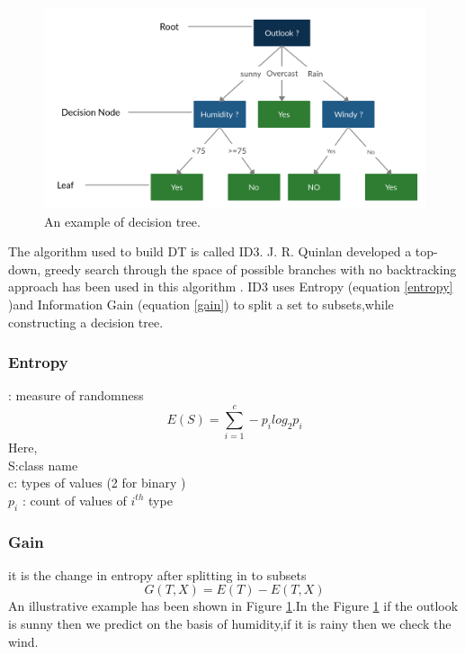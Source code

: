 \begin{figure}[ht]
    \centering
    \includegraphics[width=15cm]{Pictures/decision_tres_1.jpg}
    \caption{An example of decision tree.}
    \label{fig:decision_tree}
\end{figure}

The algorithm used to build  DT is called ID3.  J. R. Quinlan developed a top-down, greedy search through the space of possible branches with no backtracking approach has been used in this algorithm . ID3 uses Entropy (equation \ref{entropy} )and Information Gain (equation \ref{gain}) to split a set to subsets,while constructing  a decision tree.
\subsubsection{Entropy} : measure of randomness
\begin{equation}
    E(S)=\sum_{i=1}^c -p_i log_2 p_i
    \label{entropy}
\end{equation}
Here,\\
S:class name\\
c: types of values (2 for binary ) \\
$p_i$ : count of values of $i^{th}$ type\\
\subsubsection{Gain}  it is the change in entropy after splitting in to subsets
    \begin{equation}
        G(T,X) = E(T) - E(T,X)
        \label{gain}
    \end{equation}
An illustrative example has been shown in Figure \ref{fig:decision_tree}.In the Figure \ref{fig:decision_tree} if the outlook is sunny then we predict on the basis of  humidity,if it is rainy then we check the wind.   
